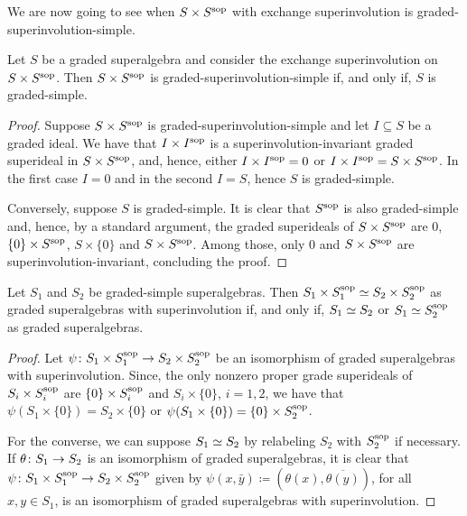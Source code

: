 We are now going to see when $S\times S^{\mathrm{sop}}$ with exchange superinvolution is graded-superinvolution-simple.

\begin{lemma}\label{lemma:SxSsop-simple}
	Let $S$ be a graded superalgebra and consider the exchange superinvolution on $S \times S^{\mathrm{sop}}$. 
	Then $S \times S^{\mathrm{sop}}$ is graded-superinvolution-simple if, and only if, $S$ is graded-simple. 
\end{lemma}

\begin{proof}
    Suppose $S \times S^{\mathrm{sop}}$ is graded-superinvolution-simple and let $I \subseteq S$ be a graded ideal. 
    We have that $I \times I^{\mathrm{sop}}$ is a superinvolution-invariant graded superideal in $S \times S^{\mathrm{sop}}$, and, hence, either $I \times I^{\mathrm{sop}} = 0$ or $I \times I^{\mathrm{sop}} = S \times S^{\mathrm{sop}}$. 
    In the first case $I = 0$ and in the second $I = S$, hence $S$ is graded-simple. 
    
    Conversely, suppose $S$ is graded-simple. 
    It is clear that $S^{\mathrm{sop}}$ is also graded-simple and, hence, by a standard argument, the graded superideals of $S \times S^{\mathrm{sop}}$ are $0$, $\{ 0 \} \times S^{\mathrm{sop}}$, $S \times \{ 0 \}$ and $S\times S^{\mathrm{sop}}$. 
    Among those, only $0$ and $S\times S^{\mathrm{sop}}$ are superinvolution-invariant, concluding the proof. 
\end{proof}

\begin{lemma}\label{lemma:iso-SxSsop}
    Let $S_1$ and $S_2$ be graded-simple superalgebras. 
    Then $S_1\times S_1^{\mathrm{sop}} \simeq S_2\times S_2^{\mathrm{sop}}$ as graded superalgebras with superinvolution if, and only if, $S_1 \simeq S_2$ or $S_1 \simeq S_2^{\mathrm{sop}}$ as graded superalgebras.
\end{lemma}

\begin{proof}
    Let $\psi\colon S_1\times S_1^{\mathrm{sop}} \to S_2\times S_2^{\mathrm{sop}}$ be an isomorphism of graded superalgebras with superinvolution. 
    Since, the only nonzero proper grade superideals of $S_i \times S_i^{\mathrm{sop}}$ are $\{ 0 \} \times S_i^{\mathrm{sop}}$ and $S_i\times \{ 0 \}$, $i = 1,2$, we have that $\psi(S_1\times \{ 0 \}) = S_2\times \{ 0 \}$ or $\psi(S_1\times \{ 0 \}) = \{ 0 \} \times S_2^{\mathrm{sop}}$.  
    
    For the converse, we can suppose $S_1 \simeq S_2$ by relabeling $S_2$ with $S_2^{\mathrm{sop}}$ if necessary.
    If $\theta \colon S_1 \to S_2$ is an isomorphism of graded superalgebras, it is clear that $\psi\colon S_1\times S_1^{\mathrm{sop}} \to S_2\times S_2^{\mathrm{sop}}$ given by $\psi (x, \bar {y}) \coloneqq (\theta(x), \overline{\theta(y)})$, for all $x,y \in S_1$, is an isomorphism of graded superalgebras with superinvolution.
\end{proof}

